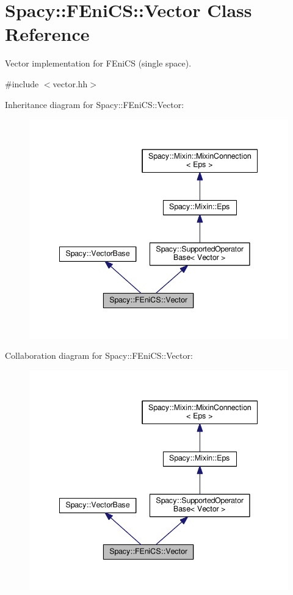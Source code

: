 \hypertarget{classSpacy_1_1FEniCS_1_1Vector}{}\section{Spacy\+:\+:F\+Eni\+C\+S\+:\+:Vector Class Reference}
\label{classSpacy_1_1FEniCS_1_1Vector}


Vector implementation for F\+Eni\+C\+S (single space).  




{\ttfamily \#include $<$vector.\+hh$>$}



Inheritance diagram for Spacy\+:\+:F\+Eni\+C\+S\+:\+:Vector\+:\nopagebreak
\begin{figure}[H]
\begin{center}
\leavevmode
\includegraphics[width=342pt]{classSpacy_1_1FEniCS_1_1Vector__inherit__graph}
\end{center}
\end{figure}


Collaboration diagram for Spacy\+:\+:F\+Eni\+C\+S\+:\+:Vector\+:\nopagebreak
\begin{figure}[H]
\begin{center}
\leavevmode
\includegraphics[width=342pt]{classSpacy_1_1FEniCS_1_1Vector__coll__graph}
\end{center}
\end{figure}
